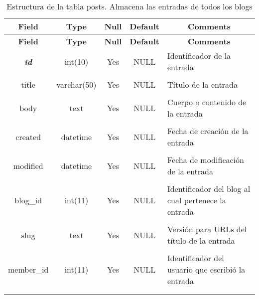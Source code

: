%
%
\begin{longtable}{c c c c l}
	\multicolumn{1}{c}{\textbf{Field}} &
	\multicolumn{1}{c}{\textbf{Type}} &
	\multicolumn{1}{c}{\textbf{Null}} &
	\multicolumn{1}{c}{\textbf{Default}} &
	\multicolumn{1}{c}{\textbf{Comments}} \\ \hline \hline
\endfirsthead
	\multicolumn{1}{c}{\textbf{Field}} &
	\multicolumn{1}{c}{\textbf{Type}} &
	\multicolumn{1}{c}{\textbf{Null}} &
	\multicolumn{1}{c}{\textbf{Default}} &
	\multicolumn{1}{c}{\textbf{Comments}} \\ \hline \hline
\endhead \endfoot
	\textbf{\textit{id}} & int(10)  & Yes & NULL & \parbox[t]{0.35\textwidth}{Identificador de la entrada} \\ \\  \hline
	title & varchar(50) & Yes & NULL & \parbox[t]{0.35\textwidth}{Título de la entrada} \\ \\  \hline
	body & text & Yes & NULL & \parbox[t]{0.35\textwidth}{Cuerpo o contenido de la entrada} \\ \\  \hline
	created & datetime & Yes & NULL & \parbox[t]{0.35\textwidth}{Fecha de creación de la entrada} \\ \\  \hline
	modified & datetime & Yes & NULL & \parbox[t]{0.35\textwidth}{Fecha de modificación de la entrada} \\ \\  \hline
	blog\_id & int(11) & Yes & NULL & \parbox[t]{0.35\textwidth}{Identificador del blog al cual pertenece la entrada} \\ \\  \hline
	slug & text & Yes & NULL & \parbox[t]{0.35\textwidth}{Versión para URLs del título de la entrada} \\ \\  \hline
	member\_id & int(11) & Yes & NULL & \parbox[t]{0.35\textwidth}{Identificador del usuario que escribió la entrada} \\ \\
\caption[Estructura de la tabla posts]{Estructura de la tabla posts. Almacena las entradas de todos los blogs} \label{tab:blog_posts-structure} \\
\end{longtable}

